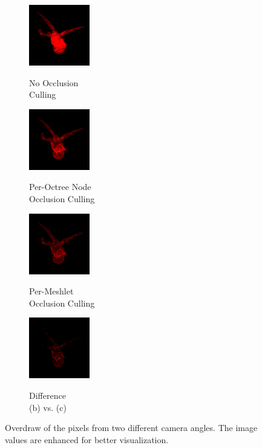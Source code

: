 \begin{figure}[!htbp]
  \begin{subfigure}{100px}
    \includegraphics[height=100px]{images/graphics/overdraw-lucy2-nocull.png}
    \caption{}
    \parbox{\linewidth}{\centering\footnotesize No Occlusion\\Culling}
  \end{subfigure}
  \begin{subfigure}{100px}
    \includegraphics[height=100px]{images/graphics/overdraw-lucy2-pooc.png}
    \caption{}
    \parbox{\linewidth}{\centering\footnotesize Per-Octree Node\\Occlusion Culling}
  \end{subfigure}
  \begin{subfigure}{100px}
    \includegraphics[height=100px]{images/graphics/overdraw-lucy2-pmoc.png}
    \caption{}
    \parbox{\linewidth}{\centering\footnotesize Per-Meshlet\\Occlusion Culling}
  \end{subfigure}
  \begin{subfigure}{100px}
    \includegraphics[height=100px]{images/graphics/overdraw-lucy2-diff.png}
    \caption{}
    \parbox{\linewidth}{\centering\footnotesize Difference\\(b) vs. (c)}
  \end{subfigure}

  \caption{Overdraw of the pixels from two different camera angles. 
  The image values are enhanced for better visualization.}
  \label{fig:lucy-overdraw}
\end{figure}

